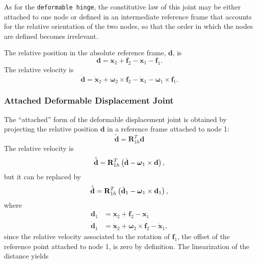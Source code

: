 \documentclass[10pt,dvips,fleqn,subeqn]{report}
\newcommand{\T}[1]{\bm{\mathbf{#1}}}
\begin{document}
As for the \texttt{deformable hinge}, the constitutive law of this joint
may be either attached to one node or defined in an intermediate
reference frame that accounts for the relative orientation of the two nodes,
so that the order in which the nodes are defined becomes irrelevant.

The relative position in the absolute reference frame, $\T{d}$, is
\begin{equation}
	\T{d} = \T{x}_2 + \T{f}_2 - \T{x}_1 - \T{f}_1 .
\end{equation}
The relative velocity is
\begin{equation}
	\dot{\T{d}} = \dot{\T{x}}_2 + \T{\omega}_2 \times \T{f}_2
		- \dot{\T{x}}_1 - \T{\omega}_1 \times \T{f}_1 .
\end{equation}

\subsubsection{Attached Deformable Displacement Joint}
The ``attached'' form of the deformable displacement joint
is obtained by projecting the relative position $\T{d}$
in a reference frame attached to node 1:
\begin{equation}
	\tilde{\T{d}} = \T{R}_{1h}^T \T{d}
\end{equation}
The relative velocity is
\begin{equation}
	\dot{\tilde{\T{d}}} = \T{R}_{1h}^T\plbr{
		\dot{\T{d}} - \T{\omega}_1 \times \T{d}
	} ,
\end{equation}
but it can be replaced by
\begin{equation}
	\dot{\tilde{\T{d}}} = \T{R}_{1h}^T\plbr{
		\dot{\T{d}}_1 - \T{\omega}_1 \times \T{d}_1
	} ,
\end{equation}
where
\begin{subequations}
\begin{align}
	\T{d}_1 &= \T{x}_2 + \T{f}_2 - \T{x}_1 \\
	\dot{\T{d}}_1 &= \dot{\T{x}}_2 + \T{\omega}_2 \times \T{f}_2 - \dot{\T{x}}_1 ,
\end{align}
\end{subequations}
since the relative velocity associated to the rotation of $\T{f}_1$,
the offset of the reference point attached to node 1,
is zero by definition.
The linearization of the distance yields
\end{document}
